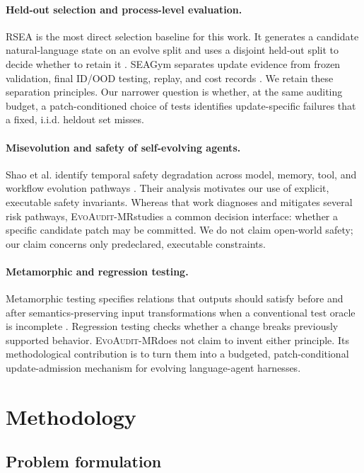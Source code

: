 \documentclass{article}
\newcommand{\method}{\textsc{EvoAudit-MR}}
\begin{document}
\paragraph{Held-out selection and process-level evaluation.}
RSEA is the most direct selection baseline for this work. It generates a candidate natural-language state on an evolve split and uses a disjoint held-out split to decide whether to retain it \citep{nguyen2026rsea}. SEAGym separates update evidence from frozen validation, final ID/OOD testing, replay, and cost records \citep{zheng2026seagym}. We retain these separation principles. Our narrower question is whether, at the same auditing budget, a patch-conditioned choice of tests identifies update-specific failures that a fixed, i.i.d. heldout set misses.

\paragraph{Misevolution and safety of self-evolving agents.}
Shao et al. identify temporal safety degradation across model, memory, tool, and workflow evolution pathways \citep{shao2026misevolve}. Their analysis motivates our use of explicit, executable safety invariants. Whereas that work diagnoses and mitigates several risk pathways, \method studies a common decision interface: whether a specific candidate patch may be committed. We do not claim open-world safety; our claim concerns only predeclared, executable constraints.

\paragraph{Metamorphic and regression testing.}
Metamorphic testing specifies relations that outputs should satisfy before and after semantics-preserving input transformations when a conventional test oracle is incomplete \citep{chen1998metamorphic}. Regression testing checks whether a change breaks previously supported behavior. \method does not claim to invent either principle. Its methodological contribution is to turn them into a budgeted, patch-conditional update-admission mechanism for evolving language-agent harnesses.

\section{Methodology}

\subsection{Problem formulation}
\end{document}
